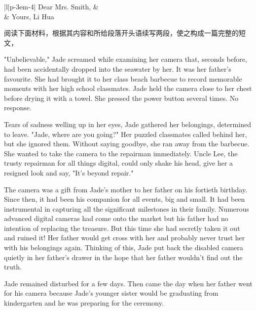 \documentclass{英语试卷}
\begin{document}
\begin{center}\begin{tabular}{{|l|p{\dimexpr\linewidth-3em-4\tabcolsep}|}}
\hline
Dear Mrs. Smith, &  \\
 & Yours, Li Hua \\
\hline
\end{tabular}\end{center}
\vspace{0.4em}
\par 阅读下面材料，根据其内容和所给段落开头语续写两段，使之构成一篇完整的短文，\par
\par "Unbelievable," Jade screamed while examining her camera that, seconds before, had been accidentally dropped into the seawater by her. It was her father's favourite. She had brought it to her class beach barbecue to record memorable moments with her high school classmates. Jade held the camera close to her chest before drying it with a towel. She pressed the power button several times. No response.\par
\par Tears of sadness welling up in her eyes, Jade gathered her belongings, determined to leave. "Jade, where are you going?" Her puzzled classmates called behind her, but she ignored them. Without saying goodbye, she ran away from the barbecue. She wanted to take the camera to the repairman immediately. Uncle Lee, the trusty repairman for all things digital, could only shake his head, give her a resigned look and say, "It's beyond repair."\par
\par The camera was a gift from Jade's mother to her father on his fortieth birthday. Since then, it had been his companion for all events, big and small. It had been instrumental in capturing all the significant milestones in their family. Numerous advanced digital cameras had come onto the market but his father had no intention of replacing the treasure. But this time she had secretly taken it out and ruined it! Her father would get cross with her and probably never trust her with his belongings again. Thinking of this, Jade put back the disabled camera quietly in her father's drawer in the hope that her father wouldn't find out the truth.\par
\par Jade remained disturbed for a few days. Then came the day when her father went for his camera because Jade's younger sister would be graduating from kindergarten and he was preparing for the ceremony.\par
\end{document}
